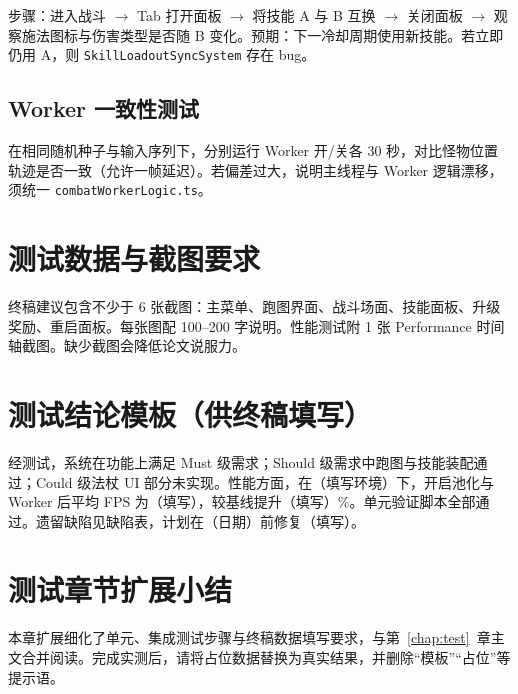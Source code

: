 步骤：进入战斗 $\rightarrow$ Tab 打开面板 $\rightarrow$ 将技能 A 与 B 互换 $\rightarrow$ 关闭面板 $\rightarrow$ 观察施法图标与伤害类型是否随 B 变化。预期：下一冷却周期使用新技能。若立即仍用 A，则 \texttt{SkillLoadoutSyncSystem} 存在 bug。

\subsection{Worker 一致性测试}

在相同随机种子与输入序列下，分别运行 Worker 开/关各 30 秒，对比怪物位置轨迹是否一致（允许一帧延迟）。若偏差过大，说明主线程与 Worker 逻辑漂移，须统一 \texttt{combatWorkerLogic.ts}\cite{kw_web_worker_game}。

\section{测试数据与截图要求}

终稿建议包含不少于 6 张截图：主菜单、跑图界面、战斗场面、技能面板、升级奖励、重启面板。每张图配 100--200 字说明。性能测试附 1 张 Performance 时间轴截图。缺少截图会降低论文说服力。

\section{测试结论模板（供终稿填写）}

经测试，系统在功能上满足 Must 级需求；Should 级需求中跑图与技能装配通过；Could 级法杖 UI 部分未实现。性能方面，在（填写环境）下，开启池化与 Worker 后平均 FPS 为（填写），较基线提升（填写）\%。单元验证脚本全部通过。遗留缺陷见缺陷表，计划在（日期）前修复（填写）。

\section{测试章节扩展小结}

本章扩展细化了单元、集成测试步骤与终稿数据填写要求，与第~\ref{chap:test}~章主文合并阅读。完成实测后，请将占位数据替换为真实结果，并删除“模板”“占位”等提示语。
